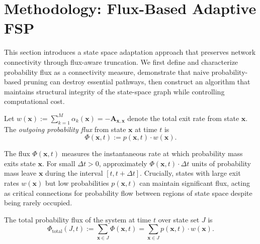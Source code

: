 \documentclass[review,onefignum,onetabnum]{siamart171218}
\begin{document}
\section{Methodology: Flux-Based Adaptive FSP}
\label{sec:methodology}

This section introduces a state space adaptation approach that preserves network connectivity through flux-aware truncation. We first define and characterize probability flux as a connectivity measure, demonstrate that naive probability-based pruning can destroy essential pathways, then construct an algorithm that maintains structural integrity of the state-space graph while controlling computational cost.

\begin{definition}
\label{def:flux}
Let $w(\boldsymbol{x}) := \sum_{k=1}^M \alpha_k(\boldsymbol{x}) = -\mathbf{A}_{\boldsymbol{x},\boldsymbol{x}}$ denote the total exit rate from state $\boldsymbol{x}$. The \textit{outgoing probability flux} from state $\boldsymbol{x}$ at time $t$ is
\begin{equation}
\Phi(\boldsymbol{x},t) := p(\boldsymbol{x},t) \cdot w(\boldsymbol{x}).
\end{equation}
\end{definition}

The flux $\Phi(\boldsymbol{x},t)$ measures the instantaneous rate at which probability mass exits state $\boldsymbol{x}$. For small $\Delta t > 0$, approximately $\Phi(\boldsymbol{x},t) \cdot \Delta t$ units of probability mass leave $\boldsymbol{x}$ during the interval $[t, t+\Delta t]$. Crucially, states with large exit rates $w(\boldsymbol{x})$ but low probabilities $p(\boldsymbol{x},t)$ can maintain significant flux, acting as critical connections for probability flow between regions of state space despite being rarely occupied.

\begin{definition}
The total probability flux of the system at time $t$ over state set $J$ is
\begin{equation}
\Phi_{\mathrm{total}}(J,t) := \sum_{\boldsymbol{x} \in J} \Phi(\boldsymbol{x},t) = \sum_{\boldsymbol{x} \in J} p(\boldsymbol{x},t) \cdot w(\boldsymbol{x}).
\end{equation}
\end{definition}
\end{document}
